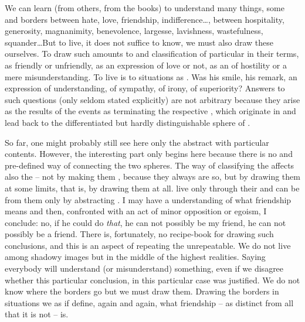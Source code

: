 We can learn (from others, from the books) to understand many things, some
 and borders between hate, love, friendship,
indifference\ldots, between hospitality, generosity, magnanimity, benevolence,
largesse, lavishness, wastefulness, squander\ldots But to live, it does
not suffice to  know, we must also draw these 
ourselves. To draw such  amounts to  and
classification of particular  in their terms, as friendly or
unfriendly, as an expression of love or not, as an  of hostility or a
mere misunderstanding. To live is to  situations as
. Was his smile, his remark, an expression of understanding, of
sympathy, of irony, of superiority? Answers to such questions (only seldom
stated explicitly) are not arbitrary because they arise as the
results of  the  events as  terminating the
respective , which originate in and lead back to the differentiated
but hardly distinguishable sphere of .

So far, one might probably still see here only  the abstract
 with particular contents. However, the interesting part only begins
here because there is no  and pre-defined way of connecting the two
spheres. The way of classifying the  affects also the
 -- not by making them , because they
always are so, but by drawing them at some  limits, that is, by
drawing them at all.  live only through their 
and can be  from them only by abstracting . I may
have a  understanding of what friendship means and then, confronted
with an act of minor opposition or egoism, I conclude: no, if he could do {\em
  that}, he can not possibly be my friend, he can not possibly be a friend.
There is, fortunately, no recipe-book for drawing such conclusions, and this is
an aspect of repeating the unrepeatable. We do not live among shadowy images but
in the middle of the highest realities. Saying  everybody will
understand (or misunderstand) something, even if we disagree whether this
particular conclusion, in this particular case was justified. We do not know
where the borders go but we must draw them.  Drawing the borders in 
situations we as if define, again and again, what friendship -- as distinct from
all that it is not -- is.

